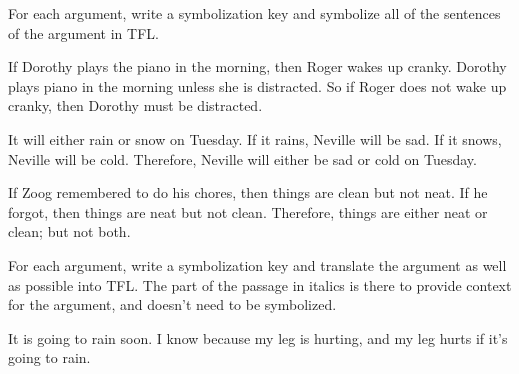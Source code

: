 \begin{practiceproblems}
\problempart
For each argument, write a symbolization key and symbolize all of the sentences of the argument in TFL.
\begin{earg}
\item If Dorothy plays the piano in the morning, then Roger wakes up cranky. Dorothy plays piano in the morning unless she is distracted. So if Roger does not wake up cranky, then Dorothy must be distracted.
\item It will either rain or snow on Tuesday. If it rains, Neville will be sad. If it snows, Neville will be cold. Therefore, Neville will either be sad or cold on Tuesday.
\item If Zoog remembered to do his chores, then things are clean but not neat. If he forgot, then things are neat but not clean. Therefore, things are either neat or clean; but not both.
\end{earg}

\problempart
For each argument, write a symbolization key and translate the argument as well as possible into TFL. The part of the passage in italics is there to provide context for the argument, and doesn't need to be symbolized.
\begin{earg}
\item It is going to rain soon. I know because my leg is hurting, and my leg hurts if it's going to rain.


\end{earg}
\end{practiceproblems}
